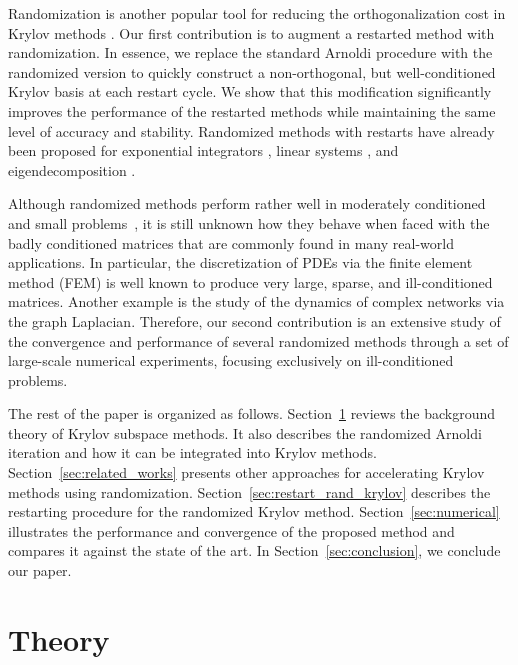 \documentclass[smallextended]{svjour3}
\begin{document}
Randomization is another popular tool for reducing the orthogonalization cost in Krylov methods \cite{bergermann_deterministic_2026,burke_gmres_2025,burke_krylov_2024,cortinovis_speeding_2024,damas_randomized_2025,grigori_restoring_2026,guttel_randomized_2023,guttel_sketch-and-select_2024,jang_randomized_2024,nakatsukasa_fast_2024,palitta_sketched_2025,simoncini_stabilized_2025}. Our first contribution is to augment a restarted method with randomization. In essence, we replace the standard Arnoldi procedure with the randomized version \cite{timsit_randomized_2023} to quickly construct a non-orthogonal, but well-conditioned Krylov basis at each restart cycle. We show that this modification significantly improves the performance of the restarted methods while maintaining the same level of accuracy and stability. Randomized methods with restarts have already been proposed for exponential integrators \cite{krieger_general_2026}, linear systems \cite{burke_gmres_2025,jang_randomized_2024}, and eigendecomposition \cite{damas_randomized_2024}.

Although randomized methods perform rather well in moderately conditioned and small problems~\cite{cortinovis_speeding_2024,guttel_randomized_2023}, it is still unknown how they behave when faced with the badly conditioned matrices that are commonly found in many real-world applications. In particular, the discretization of PDEs via the finite element method (FEM) is well known to produce very large, sparse, and ill-conditioned matrices. Another example is the study of the dynamics of complex networks via the graph Laplacian. Therefore, our second contribution is an extensive study of the convergence and performance of several randomized methods through a set of large-scale numerical experiments, focusing exclusively on ill-conditioned problems.

The rest of the paper is organized as follows. Section~\ref{sec:theory} reviews the background theory of Krylov subspace methods. It also describes the randomized Arnoldi iteration and how it can be integrated into Krylov methods. Section~\ref{sec:related_works} presents other approaches for accelerating Krylov methods using randomization. Section~\ref{sec:restart_rand_krylov} describes the restarting procedure for the randomized Krylov method. Section~\ref{sec:numerical} illustrates the performance and convergence of the proposed method and compares it against the state of the art. In Section~\ref{sec:conclusion}, we conclude our paper.

\section{Theory}
\label{sec:theory}
\end{document}
